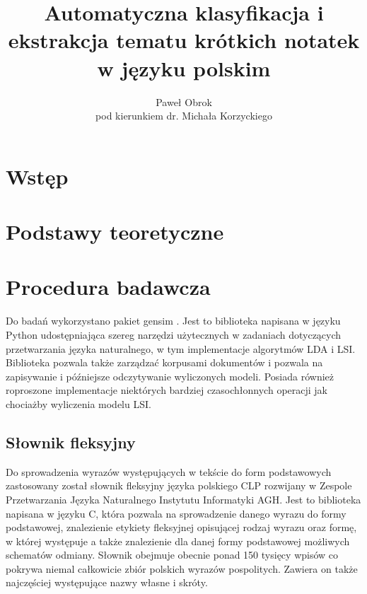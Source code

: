 \documentclass[11pt,a4paper]{article}
\begin{document}
\title{Automatyczna klasyfikacja i ekstrakcja tematu krótkich notatek w języku polskim}
\author{Paweł Obrok\\pod kierunkiem dr. Michała Korzyckiego}

\maketitle
\pagebreak

\tableofcontents
\pagebreak

\section{Wstęp}
\section{Podstawy teoretyczne}
\section{Procedura badawcza}

Do badań wykorzystano pakiet gensim \cite{gensim}. Jest to biblioteka napisana
w języku Python udostępniająca szereg narzędzi użytecznych w zadaniach
dotyczących przetwarzania języka naturalnego, w tym implementacje algorytmów
LDA i LSI. Biblioteka pozwala także zarządzać korpusami dokumentów i pozwala na
zapisywanie i późniejsze odczytywanie wyliczonych modeli. Posiada również
roproszone implementacje niektórych bardziej czasochłonnych operacji jak
chociażby wyliczenia modelu LSI.

\subsection{Słownik fleksyjny}

Do sprowadzenia wyrazów występujących w tekście do form podstawowych
zastosowany został słownik fleksyjny języka polskiego CLP
\cite{gajecki-slownik} rozwijany w Zespole Przetwarzania Języka Naturalnego
Instytutu Informatyki AGH. Jest to biblioteka napisana w języku C, która
pozwala na sprowadzenie danego wyrazu do formy podstawowej, znalezienie
etykiety fleksyjnej opisującej rodzaj wyrazu oraz formę, w której występuje a
także znalezienie dla danej formy podstawowej możliwych schematów odmiany.
Słownik obejmuje obecnie ponad 150 tysięcy wpisów co pokrywa niemal całkowicie
zbiór polskich wyrazów pospolitych. Zawiera on także najczęściej występujące
nazwy własne i skróty.
\end{document}
